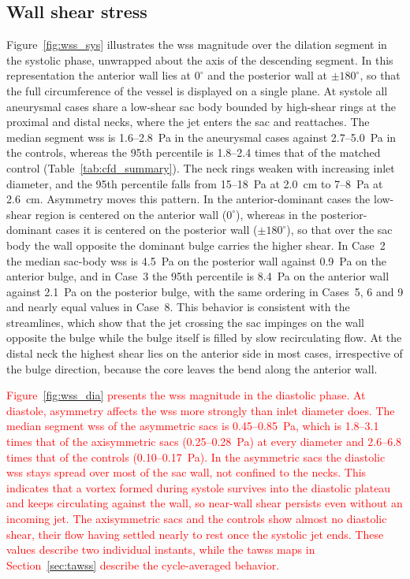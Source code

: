 \documentclass[12pt,a4paper]{article}
\newcommand{\WSS}{\ac{wss}\xspace}
\newcommand{\TAWSS}{\ac{tawss}\xspace}
\theoremstyle{definition}
\numberwithin{equation}{section}
\newcommand{\revision}[1]{\textcolor{red}{#1}}
\begin{document}
\subsection{Wall shear stress}
Figure~\ref{fig:wss_sys} illustrates the \WSS magnitude over the dilation segment in the systolic phase, unwrapped about the axis of the descending segment. In this representation the anterior wall lies at \(0^\circ\) and the posterior wall at \(\pm180^\circ\), so that the full circumference of the vessel is displayed on a single plane. At systole all aneurysmal cases share a low-shear sac body bounded by high-shear rings at the proximal and distal necks, where the jet enters the sac and reattaches. The median segment \WSS is 1.6--2.8~Pa in the aneurysmal cases against 2.7--5.0~Pa in the controls, whereas the 95th percentile is 1.8--2.4 times that of the matched control (Table~\ref{tab:cfd_summary}). The neck rings weaken with increasing inlet diameter, and the 95th percentile falls from 15--18~Pa at 2.0~cm to 7--8~Pa at 2.6~cm. Asymmetry moves this pattern. In the anterior-dominant cases the low-shear region is centered on the anterior wall (\(0^\circ\)), whereas in the posterior-dominant cases it is centered on the posterior wall (\(\pm180^\circ\)), so that over the sac body the wall opposite the dominant bulge carries the higher shear. In Case~2 the median sac-body \WSS is 4.5~Pa on the posterior wall against 0.9~Pa on the anterior bulge, and in Case~3 the 95th percentile is 8.4~Pa on the anterior wall against 2.1~Pa on the posterior bulge, with the same ordering in Cases~5, 6 and 9 and nearly equal values in Case~8. This behavior is consistent with the streamlines, which show that the jet crossing the sac impinges on the wall opposite the bulge while the bulge itself is filled by slow recirculating flow. At the distal neck the highest shear lies on the anterior side in most cases, irrespective of the bulge direction, because the core leaves the bend along the anterior wall.

\revision{Figure~\ref{fig:wss_dia} presents the \WSS magnitude in the diastolic phase. At diastole, asymmetry affects the \WSS more strongly than inlet diameter does. The median segment \WSS of the asymmetric sacs is 0.45--0.85~Pa, which is 1.8--3.1 times that of the axisymmetric sacs (0.25--0.28~Pa) at every diameter and 2.6--6.8 times that of the controls (0.10--0.17~Pa). In the asymmetric sacs the diastolic \WSS stays spread over most of the sac wall, not confined to the necks. This indicates that a vortex formed during systole survives into the diastolic plateau and keeps circulating against the wall, so near-wall shear persists even without an incoming jet. The axisymmetric sacs and the controls show almost no diastolic shear, their flow having settled nearly to rest once the systolic jet ends. These values describe two individual instants, while the \TAWSS maps in Section~\ref{sec:tawss} describe the cycle-averaged behavior.}
\end{document}

